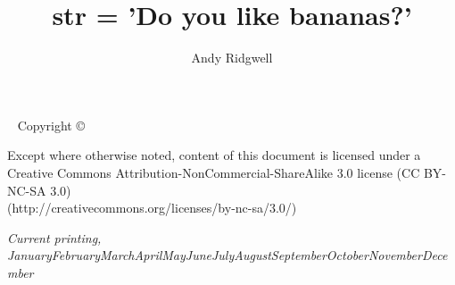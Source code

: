 \documentclass{tufte-book} %
\title{str = 'Do you like bananas?'} %
\author{Andy Ridgwell} %
\newcommand{\monthyear}{\ifcase\month\or January\or February\or March\or April\or May\or June\or July\or August\or September\or October\or November\or December\fi\space\number\year} %
\begin{document}
\frontmatter


\maketitle %


\newpage
\begin{fullwidth}
~\vfill
\thispagestyle{empty}
\setlength{\parindent}{0pt}
\setlength{\parskip}{\baselineskip}
Copyright \copyright\ \the\year\ \thanklessauthor

\par{}

\par Except where otherwise noted, content of this document is licensed under a 
\\Creative Commons Attribution-NonCommercial-ShareAlike 3.0 license (CC BY-NC-SA 3.0) 
\\(http://creativecommons.org/licenses/by-nc-sa/3.0/)

\par\textit{Current printing, \monthyear}
\end{fullwidth}


\tableofcontents %

\setcounter{chapter}{0}%


\listoffigures %


\listoftables %

\end{document}
